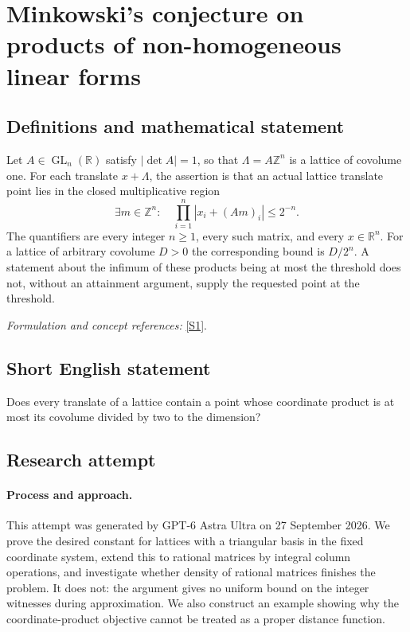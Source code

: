 \documentclass[11pt]{article}
\begin{document}
\section*{\texorpdfstring{Minkowski's conjecture on products of non-homogeneous linear forms}{Minkowski's conjecture on products of non-homogeneous linear forms}}\label{statement}
\subsection{Definitions and mathematical statement}
Let $A\in\operatorname{GL}_n({\mathbb{R}})$ satisfy $|\det A|=1$, so that $\Lambda=A{\mathbb{Z}}^n$ is a lattice of covolume one. For each translate $x+\Lambda$, the assertion is that an actual lattice translate point lies in the closed multiplicative region
\[
 \exists m\in{\mathbb{Z}}^n:\quad \prod_{i=1}^n|x_i+(Am)_i|\le2^{-n}.
\]
The quantifiers are every integer $n\ge1$, every such matrix, and every $x\in{\mathbb{R}}^n$. For a lattice of arbitrary covolume $D>0$ the corresponding bound is $D/2^n$. A statement about the infimum of these products being at most the threshold does not, without an attainment argument, supply the requested point at the threshold.
\par\smallskip\textit{Formulation and concept references:} \href{https://arxiv.org/pdf/2009.09992v1}{[S1]}.

\subsection{Short English statement}
Does every translate of a lattice contain a point whose coordinate product is at most its covolume divided by two to the dimension?
\subsection{Research attempt}
\paragraph{Process and approach.}
This attempt was generated by GPT-6 Astra Ultra on 27 September 2026. We prove the desired constant for lattices with a triangular basis in the fixed coordinate system, extend this to rational matrices by integral column operations, and investigate whether density of rational matrices finishes the problem. It does not: the argument gives no uniform bound on the integer witnesses during approximation. We also construct an example showing why the coordinate-product objective cannot be treated as a proper distance function.
\end{document}
